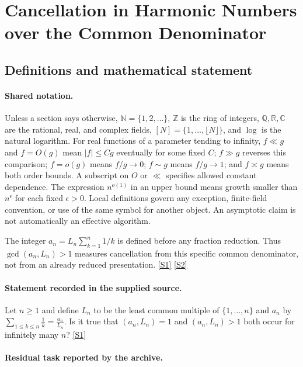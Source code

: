\documentclass[11pt,a4paper]{article}
\newcommand{\N}{\mathbb{N}}
\newcommand{\Z}{\mathbb{Z}}
\newcommand{\Q}{\mathbb{Q}}
\newcommand{\R}{\mathbb{R}}
\newcommand{\C}{\mathbb{C}}
\newcommand{\sref}[2]{\hyperlink{source:#1:#2}{[S#2]}}
\begin{document}
\section{Cancellation in Harmonic Numbers over the Common Denominator}\label{statement}


\subsection{Definitions and mathematical statement}

\paragraph{Shared notation.}Unless a section says otherwise, $\N=\{1,2,\ldots\}$,
$\Z$ is the ring of integers, $\Q,\R,\C$ are the rational, real, and complex
fields, $[N]=\{1,\ldots,\lfloor N\rfloor\}$, and $\log$ is the natural
logarithm. For real functions of a parameter tending to infinity,
$f\ll g$ and $f=O(g)$ mean $|f|\leq Cg$ eventually for some fixed $C$;
$f\gg g$ reverses this comparison; $f=o(g)$ means $f/g\to0$;
$f\sim g$ means $f/g\to1$; and $f\asymp g$ means both order bounds.
A subscript on $O$ or $\ll$ specifies allowed constant dependence.
The expression $n^{o(1)}$ in an upper bound means growth smaller than
$n^\epsilon$ for each fixed $\epsilon>0$. Local definitions govern any
exception, finite-field convention, or use of the same symbol for another
object. An asymptotic claim is not automatically an effective algorithm.



The integer $a_n=L_n\sum_{k=1}^n1/k$ is defined before any fraction reduction. Thus $\gcd(a_n,L_n)>1$ measures cancellation from this specific common denominator, not from an already reduced presentation. \sref{statement}{1} \sref{statement}{2}

\paragraph{Statement recorded in the supplied source.}
Let $n\geq 1$ and define $L_n$ to be the least common multiple of $\{1,\ldots,n\}$ and $a_n$ by $ \sum_{1\leq k\leq n}\frac{1}{k}=\frac{a_n}{L_n}. $ Is it true that $(a_n,L_n)=1$ and $(a_n,L_n)>1$ both occur for infinitely many $n$? \sref{statement}{1}

\paragraph{Residual task reported by the archive.}
\end{document}
